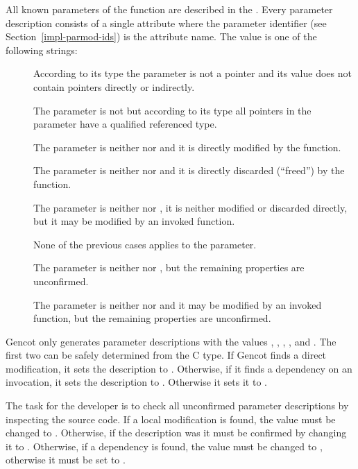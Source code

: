 All known parameters of the function are described in the . 
Every parameter description consists of a single attribute where the parameter identifier (see Section~\ref{impl-parmod-ids})
is the attribute name. The value is one of the following strings:
\begin{description}
\item[] According to its type the parameter is not a pointer and its value does not contain pointers directly or
indirectly.
\item[] The parameter is not  but according to its type all pointers in the parameter have a  qualified referenced type.
\item[] The parameter is neither  nor  and it is directly modified by the function.
\item[] The parameter is neither  nor  and it is directly discarded 
(``freed'') by the function. 
\item[] The parameter is neither  nor , it is neither modified 
or discarded directly, but it may be modified by an invoked function. 
\item[] None of the previous cases applies to the parameter.
\item[] The parameter is neither  nor , but the remaining properties are unconfirmed.
\item[] The parameter is neither  nor  and it may be modified by an invoked function,
but the remaining properties are unconfirmed.
\end{description}

Gencot only generates parameter descriptions with the values , , , , and .
The first two can be safely determined from the C type. If Gencot finds a direct modification, it sets the description to 
. Otherwise, if it finds a dependency on an invocation, it sets the description to . Otherwise
it sets it to .

The task for the developer is to check all unconfirmed parameter descriptions by inspecting the source code. If a local modification
is found, the value must be changed to . Otherwise, if the description was  it must be confirmed 
by changing it to . Otherwise, if a dependency is found, the value  must be changed to ,
otherwise it must be set to .

